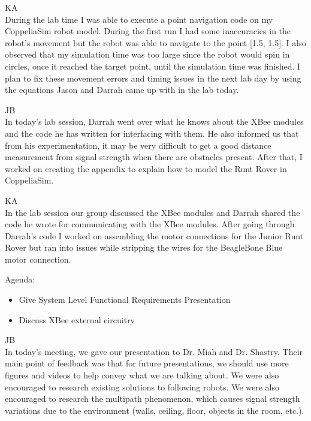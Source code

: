 \documentclass[fontsize=11pt, %
                             paper=letter, %
                             openany, %
                             captions=tableheading,
                             index=totoc,
                             hyperref]{labbook}
\begin{document}
\begin{addmargin}[0cm]{0cm}
\vspace*{12pt}
KA\\
During the lab time I was able to execute a point navigation code on my CoppeliaSim robot model. During the first run I had some inaccuracies in the robot's movement but the robot was able to navigate to the point [1.5, 1.5]. I also observed that my simulation time was too large since the robot would spin in circles, once it reached the target point, until the simulation time was finished. I plan to fix these movement errors and timing issues in the next lab day by using the equations Jason and Darrah came up with in the lab today.


JB\\
In today's lab session, Darrah went over what he knows about the XBee modules and the code he has written for interfacing with them. He also informed us that from his experimentation, it may be very difficult to get a good distance measurement from signal strength when there are obstacles present. After that, I worked on creating the appendix to explain how to model the Runt Rover in CoppeliaSim.

\vspace*{12pt}
KA\\
In the lab session our group discussed the XBee modules and Darrah shared the code he wrote for communicating with the XBee modules. After going through Darrah's code I worked on assembling the motor connections for the Junior Runt Rover but ran into issues while stripping the wires for the BeagleBone Blue motor connection. 

Agenda:
\begin{itemize}
    \item Give System Level Functional Requirements Presentation
    \item Discuss XBee external circuitry
\end{itemize}

JB\\
In today's meeting, we gave our presentation to Dr. Miah and Dr. Shastry. Their main point of feedback was that for future presentations, we should use more figures and videos to help convey what we are talking about. We were also encouraged to research existing solutions to following robots. We were also encouraged to research the multipath phenomenon, which causes signal strength variations due to the environment (walls, ceiling, floor, objects in the room, etc.).


\end{addmargin}
\end{document}
